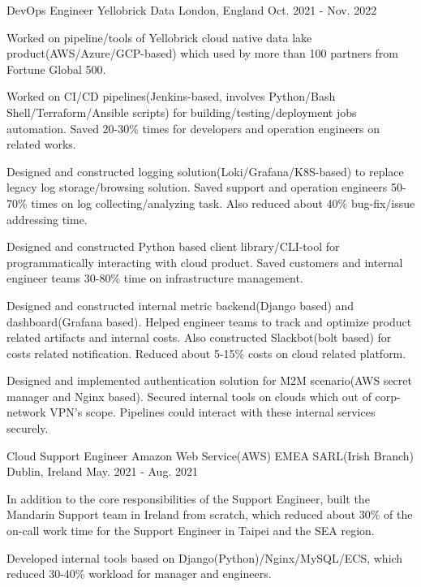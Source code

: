 \begin{cventries}
    \cventry
        {DevOps Engineer}
        {Yellobrick Data}
        {London, England}
        {Oct. 2021 - Nov. 2022}
        {
            \begin{cvitems}
                \item
               {
                    Worked on pipeline/tools of Yellobrick cloud native data lake product(AWS/Azure/GCP-based) which used by more than 100 partners from Fortune Global 500.
               }
                \item
               {
                    Worked on CI/CD pipelines(Jenkins-based, involves Python/Bash Shell/Terraform/Ansible scripts) for building/testing/deployment jobs automation. Saved 20-30\% times for developers and operation engineers on related works.
               }
                \item
                {
                    Designed and constructed logging solution(Loki/Grafana/K8S-based) to replace legacy log storage/browsing solution. Saved support and operation engineers 50-70\% times on log collecting/analyzing task. Also reduced about 40\% bug-fix/issue addressing time. 
                    }
                \item
                {
                    Designed and constructed Python based client library/CLI-tool for programmatically interacting with cloud product. Saved customers and internal engineer teams 30-80\% time on infrastructure management. 
                }
                \item
                {
                    Designed and constructed internal metric backend(Django based) and dashboard(Grafana based). Helped engineer teams to track and optimize product related artifacts and internal costs. Also constructed Slackbot(bolt based) for costs related notification. Reduced about 5-15\% costs on cloud related platform. 
                }
                \item
                {
                    Designed and implemented authentication solution for M2M scenario(AWS secret manager and Nginx based). Secured internal tools on clouds which out of corp-network VPN's scope. Pipelines could interact with these internal services securely.
                }
            \end{cvitems}
        }

    \cventry
        {Cloud Support Engineer}
        {Amazon Web Service(AWS) EMEA SARL(Irish Branch)}
        {Dublin, Ireland}
        {May. 2021 - Aug. 2021}
        {   
            \begin{cvitems}
                \item
                {
                    In addition to the core responsibilities of the Support Engineer, built the Mandarin Support team in Ireland from scratch, which reduced about 30\% of the on-call work time for the Support Engineer in Taipei and the SEA region.
                }
                \item
                {
                    Developed internal tools based on Django(Python)/Nginx/MySQL/ECS, which reduced 30-40\% workload for manager and engineers.
                }
            \end{cvitems}
        }


\end{cventries}
